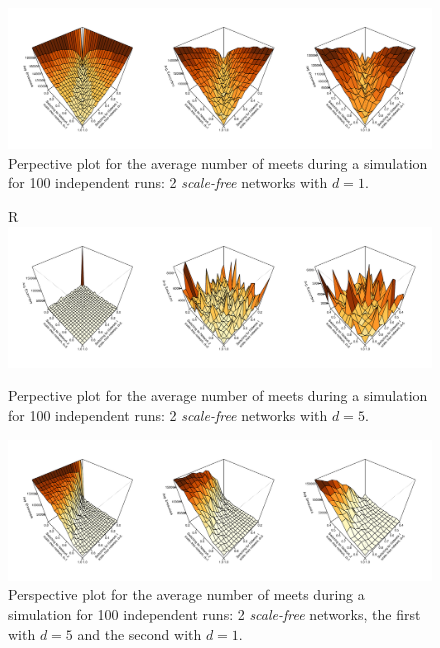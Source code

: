 \begin{figure}[H]
	\centering
	\includegraphics[width=1\linewidth]{"../analysis/pdf/context_switching_2_sf_d1_switching_persp"}
	\begin{minipage}{0.9\textwidth}
		\caption{Perpective plot for the average number of meets during a simulation for 100 independent runs: 2 \textit{scale-free} networks with $d=1$.}
		\label{append_fig:ctx_cs_2_sd_d1}
	\end{minipage}
\end{figure}

\begin{figure}[H]
	\centering
R	\includegraphics[width=1\linewidth]{"../analysis/pdf/context_switching_2_sf_d5_switching_persp"}
	\begin{minipage}{0.9\textwidth}
		\caption{Perpective plot for the average number of meets during a simulation for 100 independent runs: 2 \textit{scale-free} networks with $d=5$.}
		\label{append_fig:ctx_cs_2_sd_d5}
	\end{minipage}
\end{figure}

\begin{figure}[H]
	\centering
	\includegraphics[width=1\linewidth]{"../analysis/pdf/context_switching_sf_d5_d1_switching_persp"}
	\begin{minipage}{0.9\textwidth}
		\caption{Perspective plot for the average number of meets during a simulation for 100 independent runs: 2 \textit{scale-free} networks, the first with $d=5$ and the second with $d=1$.}
		\label{append_fig:ctx_cs_sf_d5_d1}
	\end{minipage}
\end{figure}


